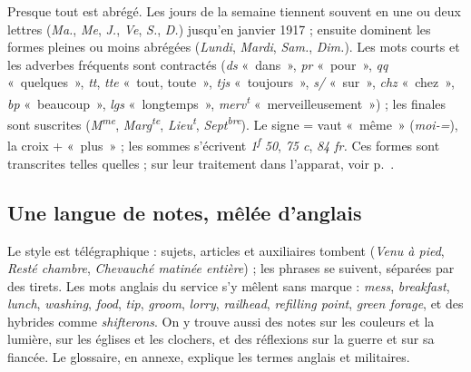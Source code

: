 Presque tout est abrégé. Les jours de la semaine tiennent souvent en une ou deux lettres (\textit{Ma.}, \textit{Me}, \textit{J.}, \textit{Ve}, \textit{S.}, \textit{D.}) jusqu'en janvier 1917 ; ensuite dominent les formes pleines ou moins abrégées (\textit{Lundi}, \textit{Mardi}, \textit{Sam.}, \textit{Dim.}). Les mots courts et les adverbes fréquents sont contractés (\textit{ds} «~dans~», \textit{pr} «~pour~», \textit{qq} «~quelques~», \textit{tt}, \textit{tte} «~tout, toute~», \textit{tjs} «~toujours~», \textit{s/} «~sur~», \textit{chz} «~chez~», \textit{bp} «~beaucoup~», \textit{lgs} «~longtemps~», \textit{merv\textsuperscript{t}} «~merveilleusement~») ; les finales sont suscrites (\textit{M\textsuperscript{me}}, \textit{Marg\textsuperscript{te}}, \textit{Lieu\textsuperscript{t}}, \textit{Sept\textsuperscript{bre}}). Le signe = vaut «~même~» (\textit{moi-=}), la croix + «~plus~» ; les sommes s'écrivent \textit{1\textsuperscript{f} 50}, \textit{75 c}, \textit{84 fr.} Ces formes sont transcrites telles quelles ; sur leur traitement dans l'apparat, voir p.~\pageref{intro:apparat}.

\subsection{Une langue de notes, mêlée d'anglais}

Le style est télégraphique : sujets, articles et auxiliaires tombent (\textit{Venu à pied}, \textit{Resté chambre}, \textit{Chevauché matinée entière}) ; les phrases se suivent, séparées par des tirets. Les mots anglais du service s'y mêlent sans marque : \textit{mess}, \textit{breakfast}, \textit{lunch}, \textit{washing}, \textit{food}, \textit{tip}, \textit{groom}, \textit{lorry}, \textit{railhead}, \textit{refilling point}, \textit{green forage}, et des hybrides comme \textit{shifterons}. On y trouve aussi des notes sur les couleurs et la lumière, sur les églises et les clochers, et des réflexions sur la guerre et sur sa fiancée. Le glossaire, en annexe, explique les termes anglais et militaires.

